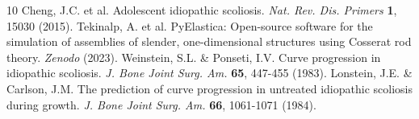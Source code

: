 \documentclass[11pt]{article}
\begin{document}
\begin{thebibliography}{10}
 Cheng, J.C. et al. Adolescent idiopathic scoliosis. \textit{Nat. Rev. Dis. Primers} \textbf{1}, 15030 (2015).
 Tekinalp, A. et al. PyElastica: Open-source software for the simulation of assemblies of slender, one-dimensional structures using Cosserat rod theory. \textit{Zenodo} (2023).
 Weinstein, S.L. & Ponseti, I.V. Curve progression in idiopathic scoliosis. \textit{J. Bone Joint Surg. Am.} \textbf{65}, 447-455 (1983).
 Lonstein, J.E. & Carlson, J.M. The prediction of curve progression in untreated idiopathic scoliosis during growth. \textit{J. Bone Joint Surg. Am.} \textbf{66}, 1061-1071 (1984).
\end{thebibliography}
\end{document}
